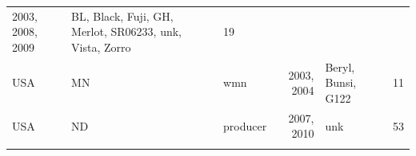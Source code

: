 \documentclass[fleqn,10pt,lineno]{wlpeerj} %
\theoremstyle{definition}
\theoremstyle{definition}
\theoremstyle{definition}
\theoremstyle{remark}
\begin{document}
\begin{longtable}[]{@{}lllrlr@{}}
\begin{minipage}[t]{0.19\columnwidth}
2003, 2008, 2009\strut
\end{minipage} & \begin{minipage}[t]{0.29\columnwidth}\raggedright\strut
BL, Black, Fuji, GH, Merlot, SR06233, unk, Vista, Zorro\strut
\end{minipage} & \begin{minipage}[t]{0.04\columnwidth}\raggedleft\strut
19\strut
\end{minipage}\tabularnewline
\begin{minipage}[t]{0.11\columnwidth}\raggedright\strut
USA\strut
\end{minipage} & \begin{minipage}[t]{0.08\columnwidth}\raggedright\strut
MN\strut
\end{minipage} & \begin{minipage}[t]{0.12\columnwidth}\raggedright\strut
wmn\strut
\end{minipage} & \begin{minipage}[t]{0.19\columnwidth}\raggedleft\strut
2003, 2004\strut
\end{minipage} & \begin{minipage}[t]{0.29\columnwidth}\raggedright\strut
Beryl, Bunsi, G122\strut
\end{minipage} & \begin{minipage}[t]{0.04\columnwidth}\raggedleft\strut
11\strut
\end{minipage}\tabularnewline
\begin{minipage}[t]{0.11\columnwidth}\raggedright\strut
USA\strut
\end{minipage} & \begin{minipage}[t]{0.08\columnwidth}\raggedright\strut
ND\strut
\end{minipage} & \begin{minipage}[t]{0.12\columnwidth}\raggedright\strut
producer\strut
\end{minipage} & \begin{minipage}[t]{0.19\columnwidth}\raggedleft\strut
2007, 2010\strut
\end{minipage} & \begin{minipage}[t]{0.29\columnwidth}\raggedright\strut
unk\strut
\end{minipage} & \begin{minipage}[t]{0.04\columnwidth}\raggedleft\strut
53\strut
\end{minipage}\tabularnewline
\begin{minipage}[t]{0.11\columnwidth}\raggedright\strut
\strut
\end{minipage} & \begin{minipage}[t]{0.08\columnwidth}\raggedright\strut

\end{minipage}
\end{longtable}
\end{document}
